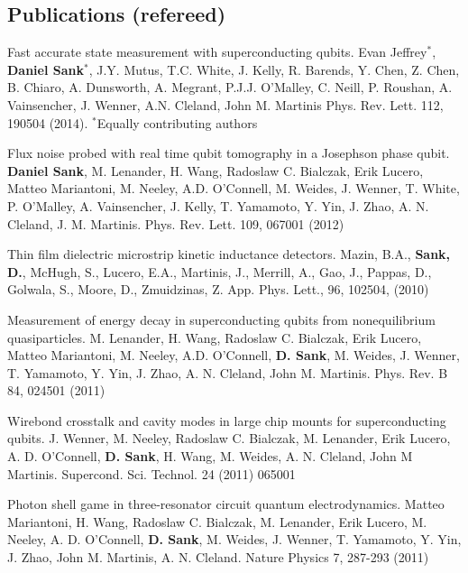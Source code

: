 \documentclass[margin=2cm,line]{res}
\newenvironment{list3}{
  \begin{list}{}{%
      \setlength{\itemsep}{0in}
      \setlength{\parsep}{0in} \setlength{\parskip}{0in}
      \setlength{\topsep}{0in} \setlength{\partopsep}{0in}
      \setlength{\leftmargin}{0.2in}}}{\end{list}}
\begin{document}
\begin{resume}
\pagebreak


\section{\sc Publications (refereed)}

\begin{list3}

\item Fast accurate state measurement with superconducting qubits. Evan Jeffrey$^*$, \textbf{Daniel Sank}$^*$, J.Y. Mutus, T.C. White, J. Kelly, R. Barends, Y. Chen, Z. Chen, B. Chiaro, A. Dunsworth, A. Megrant, P.J.J. O'Malley, C. Neill, P. Roushan, A. Vainsencher, J. Wenner, A.N. Cleland, John M. Martinis Phys. Rev. Lett. 112, 190504 (2014). $^*$Equally contributing authors\\

\item Flux noise probed with real time qubit tomography in a Josephson phase qubit. \textbf{Daniel Sank}, M. Lenander, H. Wang, Radoslaw C. Bialczak, Erik Lucero, Matteo Mariantoni, M. Neeley, A.D. O'Connell, M. Weides, J. Wenner, T. White, P. O'Malley, A. Vainsencher, J. Kelly, T. Yamamoto, Y. Yin, J. Zhao, A. N. Cleland, J. M. Martinis. Phys. Rev. Lett. 109, 067001 (2012) \\

\item Thin film dielectric microstrip kinetic inductance detectors. Mazin, B.A., \textbf{Sank, D.}, McHugh, S., Lucero, E.A., Martinis, J., Merrill, A., Gao, J., Pappas, D., Golwala, S., Moore, D., Zmuidzinas, Z. App. Phys. Lett., 96, 102504, (2010) \\

\item Measurement of energy decay in superconducting qubits from nonequilibrium quasiparticles. M. Lenander, H. Wang, Radoslaw C. Bialczak, Erik Lucero, Matteo Mariantoni, M. Neeley, A.D. O'Connell, \textbf{D. Sank}, M. Weides, J. Wenner, T. Yamamoto, Y. Yin, J. Zhao, A. N. Cleland, John M. Martinis. Phys. Rev. B 84, 024501 (2011)

\item Wirebond crosstalk and cavity modes in large chip mounts for superconducting qubits. J. Wenner, M. Neeley, Radoslaw C. Bialczak, M. Lenander, Erik Lucero, A. D. O'Connell, \textbf{D. Sank}, H. Wang, M. Weides, A. N. Cleland, John M Martinis. Supercond. Sci. Technol. 24 (2011) 065001 \\

\item Photon shell game in three-resonator circuit quantum electrodynamics. Matteo Mariantoni, H. Wang, Radoslaw C. Bialczak, M. Lenander, Erik Lucero, M. Neeley, A. D. O'Connell, \textbf{D. Sank}, M. Weides, J. Wenner, T. Yamamoto, Y. Yin, J. Zhao, John M. Martinis, A. N. Cleland. Nature Physics 7, 287-293 (2011) \\


\end{list3}
\end{resume}
\end{document}
